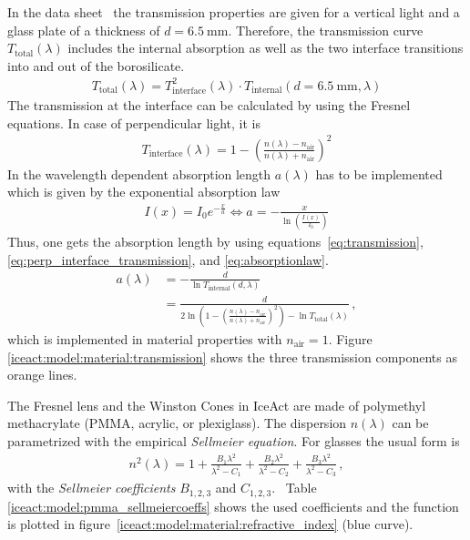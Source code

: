 In the data sheet~\cite{iceact:borosilicate:datasheet} the transmission properties are given for a vertical light and a glass plate of a thickness of $d = \SI{6.5}{\milli\meter}$. Therefore, the transmission curve $T_\text{total}(\lambda)$ includes the internal absorption as well as the two interface transitions into and out of the borosilicate.
\begin{align}
	T_\text{total}(\lambda) = T_\text{interface}^2(\lambda)\cdot T_\text{internal}(d=\SI{6.5}{\milli\meter},\lambda)
	\label{eq:transmission}
\end{align}
The transmission at the interface can be calculated by using the Fresnel equations. In case of perpendicular light, it is
\begin{align}
	T_\text{interface}(\lambda) = 1 - \left(\frac{n(\lambda)-n_\text{air}}{n(\lambda)+n_\text{air}}\right)^2
	\label{eq:perp_interface_transmission}
\end{align}
In \geant the wavelength dependent absorption length $a(\lambda)$ has to be implemented which is given by the exponential absorption law
\begin{align}
	I(x) = I_0 e^{-\frac{x}{a}} \Leftrightarrow a = - \frac{x}{\ln\left(\frac{I(x)}{I_0}\right)}
	\label{eq:absorptionlaw}
\end{align}
Thus, one gets the absorption length by using equations~\eqref{eq:transmission}, \eqref{eq:perp_interface_transmission}, and \eqref{eq:absorptionlaw}.
\begin{align}
	a(\lambda) &= - \frac{d}{\ln T_\text{internal}(d,\lambda)}\\
	&= \frac{d}{2\ln\left(1 - \left(\frac{n(\lambda)-n_\text{air}}{n(\lambda)+n_\text{air}}\right)^2\right)-\ln T_\text{total}(\lambda)}\,,
\end{align}
which is implemented in \geant material properties with $n_\text{air} = 1$. Figure \ref{iceact:model:material:transmission} shows the three transmission components as orange lines.

The Fresnel lens and the Winston Cones in IceAct are made of polymethyl methacrylate (PMMA, acrylic, or plexiglass). The dispersion $n(\lambda)$ can be parametrized with the empirical \textit{Sellmeier equation}. For glasses the usual form is
\begin{align}
	n^2(\lambda) = 1 + \frac{B_1\lambda^2}{\lambda^2-C_1} + \frac{B_2\lambda^2}{\lambda^2-C_2} + \frac{B_3\lambda^2}{\lambda^2-C_3}\,,
	\label{eq:sellmeier}
\end{align}
with the \textit{Sellmeier coefficients} $B_{1,2,3}$ and $C_{1,2,3}$.~\cite{iceact:sellmeier} Table \ref{iceact:model:pmma_sellmeiercoeffs} shows the used coefficients and the function is plotted in figure~\ref{iceact:model:material:refractive_index} (blue curve).

